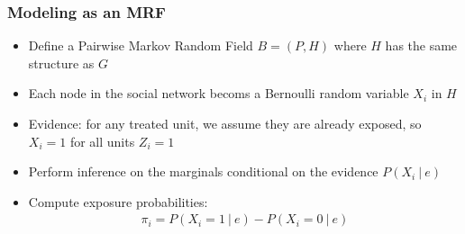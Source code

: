 \documentclass[
	11pt, %
]{beamer}
\begin{document}
\begin{frame}
	\frametitle{Modeling as an MRF}
	\begin{itemize}
		\setlength\itemsep{1em}
		\item Define a Pairwise Markov Random Field $B = (P, H)$ where $H$ has the same structure as $G$
		\item Each node in the social network becoms a Bernoulli random variable $X_i$ in $H$
		\item Evidence: for any treated unit, we assume they are already exposed, so $X_i = 1$ for all units $Z_i = 1$
		\item Perform inference on the marginals conditional on the evidence $P(X_i\ |\ e)$
		\item Compute exposure probabilities: \begin{align*}
			\pi_i = P(X_i = 1\ |\ e) - P(X_i = 0\ |\ e)
		\end{align*}
	\end{itemize}
\end{frame}
\end{document}
